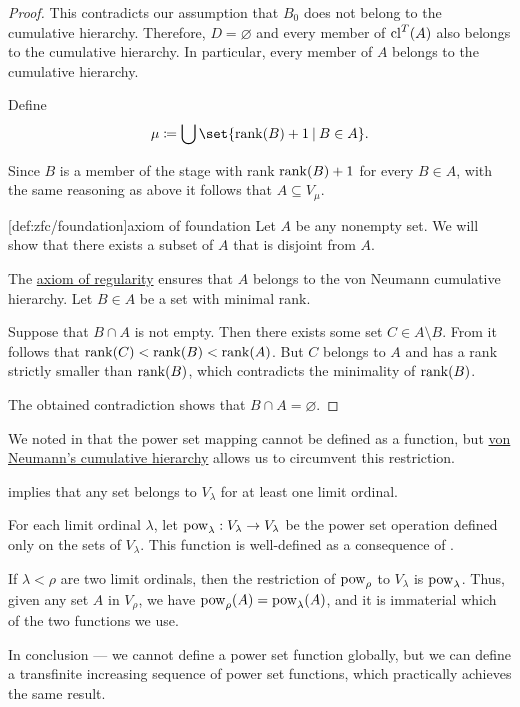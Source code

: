 \begin{proof}
  This contradicts our assumption that \( B_0 \) does not belong to the cumulative hierarchy. Therefore, \( D = \varnothing \) and every member of \( \operatorname{cl}^T(A) \) also belongs to the cumulative hierarchy. In particular, every member of \( A \) belongs to the cumulative hierarchy.

  Define
  \begin{equation*}
    \mu \coloneqq \bigcup\set{ \rank(B) + 1 \given B \in A }.
  \end{equation*}

  Since \( B \) is a member of the stage with rank \( \operatorname{rank}(B) + 1 \) for every \( B \in A \), with the same reasoning as above it follows that \( A \subseteq V_\mu \).

  [def:zfc/foundation]{axiom of foundation} Let \( A \) be any nonempty set. We will show that there exists a subset of \( A \) that is disjoint from \( A \).

  The \hyperref[thm:axiom_of_regularity]{axiom of regularity} ensures that \( A \) belongs to the von Neumann cumulative hierarchy. Let \( B \in A \) be a set with minimal rank.

  Suppose that \( B \cap A \) is not empty. Then there exists some set \( C \in A \setminus B \). From  it follows that \( \operatorname{rank}(C) < \operatorname{rank}(B) < \operatorname{rank}(A) \). But \( C \) belongs to \( A \) and has a rank strictly smaller than \( \operatorname{rank}(B) \), which contradicts the minimality of \( \operatorname{rank}(B) \).

  The obtained contradiction shows that \( B \cap A = \varnothing \).
\end{proof}

\begin{remark}\label{rem:pow_in_cumulative_hierarchy}
  We noted in  that the power set mapping cannot be defined as a function, but \hyperref[def:cumulative_hierarchy]{von Neumann's cumulative hierarchy} allows us to circumvent this restriction.

   implies that any set belongs to \( V_\lambda \) for at least one limit ordinal.

  For each limit ordinal \( \lambda \), let \( \operatorname{pow}_\lambda: V_\lambda \to V_\lambda \) be the power set operation defined only on the sets of \( V_\lambda \). This function is well-defined as a consequence of .

  If \( \lambda < \rho \) are two limit ordinals, then the restriction of \( \operatorname{pow}_\rho \) to \( V_\lambda \) is \( \operatorname{pow}_\lambda \). Thus, given any set \( A \) in \( V_\rho \), we have \( \operatorname{pow}_\rho(A) = \operatorname{pow}_\lambda(A) \), and it is immaterial which of the two functions we use.

  In conclusion --- we cannot define a power set function globally, but we can define a transfinite increasing sequence of power set functions, which practically achieves the same result.
\end{remark}

